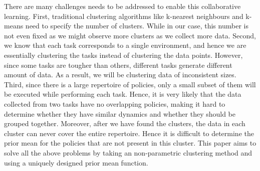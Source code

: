 There are many challenges needs to be addressed to enable this collaborative learning. First, traditional clustering algorithms like k-nearest neighbours \cite{knn} and k-means \cite{k-means} need to specify the number of clusters. While in our case, this number is not even fixed as we might observe more clusters as we collect more data.
Second, we know that each task corresponds to a single environment, and hence we are essentially clustering the tasks instead of clustering the data points.
However, since some tasks are tougher than others, different tasks generate different amount of data. 
As a result, we will be clustering data of inconsistent sizes.
Third, since there is a large repertoire of policies, only a small subset of them will be executed while performing each task. Hence, it is very likely that the data collected from two tasks have no overlapping policies, making it hard to determine whether they have similar dynamics and whether they should be grouped together.
Moreover, after we have found the clusters, the data in each cluster can never cover the entire repertoire. Hence it is difficult to determine the prior mean for the policies that are not present in this cluster.
This paper aims to solve all the above problems by taking an non-parametric clustering method and using a uniquely designed prior mean function.